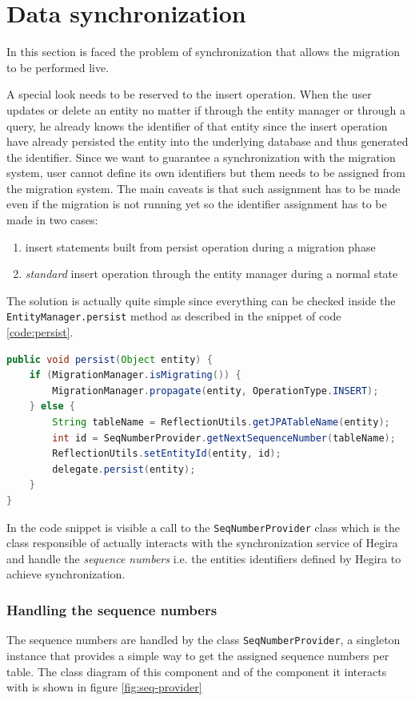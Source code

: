\section{Data synchronization}
\label{sec:sync}
In this section is faced the problem of synchronization that allows the migration to be performed live.

\noindent A special look needs to be reserved to the insert operation. When the user updates or delete an entity no matter if through the entity manager or through a query, he already knows the identifier of that entity since the insert operation have already persisted the entity into the underlying database and thus generated the identifier.
Since we want to guarantee a synchronization with the migration system, user cannot define its own identifiers but them needs to be assigned from the migration system.
The main caveats is that such assignment has to be made even if the migration is not running yet so the identifier assignment has to be made in two cases:
\begin{enumerate}
\item insert statements built from persist operation during a migration phase
\item \textit{standard} insert operation through the entity manager during a normal state
\end{enumerate}

\noindent The solution is actually quite simple since everything can be checked inside the \texttt{EntityManager.persist} method as described in the snippet of code \ref{code:persist}.

\begin{lstlisting}[language=Java, caption=Persist operation, label=code:persist]
public void persist(Object entity) {
    if (MigrationManager.isMigrating()) {
        MigrationManager.propagate(entity, OperationType.INSERT);
    } else {
        String tableName = ReflectionUtils.getJPATableName(entity);
        int id = SeqNumberProvider.getNextSequenceNumber(tableName);
        ReflectionUtils.setEntityId(entity, id);
        delegate.persist(entity);
    }
}
\end{lstlisting}

\noindent In the code snippet is visible a call to the  \texttt{SeqNumberProvider} class which is the class responsible of actually interacts with the synchronization service of Hegira and handle the \textit{sequence numbers} i.e. the entities identifiers defined by Hegira to achieve synchronization. 

\subsubsection{Handling the sequence numbers}
The sequence numbers are handled by the class \texttt{SeqNumberProvider}, a singleton instance that provides a simple way to get the assigned sequence numbers per table.
\noindent The class diagram of this component and of the component it interacts with is shown in figure \ref{fig:seq-provider}

